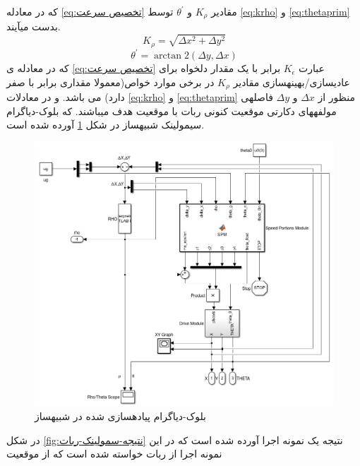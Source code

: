 \documentclass[10pt,a4paper]{article}
\newcommand{\نیمفاصله}{\halfspace}
\renewcommand{\ }{\halfspace}
\begin{document}
که در معادله
\ref{eq:تخصیص سرعت}
مقادیر
$K_{\rho}$
و $\theta^\prime$ توسط
\ref{eq:krho}
و
\ref{eq:thetaprim}
بدست می\ آیند.
\begin{equation}
K_{\rho} = \sqrt{\Delta{x}^2 + \Delta{y}^2}
\label{eq:krho}
\end{equation}
\vspace{-4.5em}
\begin{equation}
\theta^\prime = \arctan2{(\Delta{y}, \Delta{x})}
\label{eq:thetaprim}
\end{equation}
که در معادله ی
\ref{eq:تخصیص سرعت}
عبارت
$K_\epsilon$
برابر با یک مقدار دلخواه برای عادی\ سازی/بهینه\ سازی مقادیر
$K_\rho$
در برخی موارد خواص(معمولا مقداری برابر با صفر دارد) می باشد.
و
در معادلات
\ref{eq:krho}
و
\ref{eq:thetaprim}
منظور از
$\Delta{x}$
و
$\Delta{y}$
فاصله\ ی مولفه\ های دکارتی موقعیت کنونی ربات با موقعیت هدف می\ باشند. که بلوک-دیاگرام سیمولینک شبیه\ ساز در شکل
\ref{fig:سمولینک-ربات}
آورده شده است.
\vspace{-1em}
\begin{figure}[H]
    \centering
    \includegraphics[width=1\textwidth]{deminer-simu}
    \caption{بلوک-دیاگرام پیاده\ سازی شده در شبیه\ ساز}
    \label{fig:سمولینک-ربات}
\end{figure}
\label{sec:نتیجه}
در شکل
\ref{fig:نتیجه-سمولینک-ربات}
نتیجه یک نمونه اجرا آورده شده است که در این نمونه اجرا از ربات خواسته شده است که از موقعیت
\end{document}
